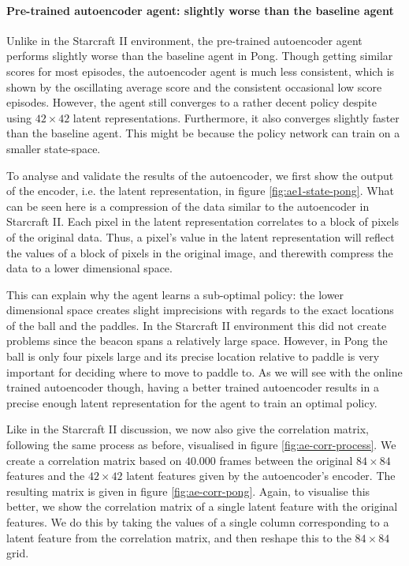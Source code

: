 \paragraph{Pre-trained autoencoder agent: slightly worse than the baseline agent}
Unlike in the Starcraft II environment, the pre-trained autoencoder agent performs slightly worse than the baseline agent in Pong. Though getting similar scores for most episodes, the autoencoder agent is much less consistent, which is shown by the oscillating average score and the consistent occasional low score episodes. However, the agent still converges to a rather decent policy despite using $42 \times 42$ latent representations. Furthermore, it also converges slightly faster than the baseline agent. This might be because the policy network can train on a smaller state-space.

To analyse and validate the results of the autoencoder, we first show the output of the encoder, i.e. the latent representation, in figure \ref{fig:ae1-state-pong}. What can be seen here is a compression of the data similar to the autoencoder in Starcraft II. Each pixel in the latent representation correlates to a block of pixels of the original data. Thus, a pixel's value in the latent representation will reflect the values of a block of pixels in the original image, and therewith compress the data to a lower dimensional space. 

This can explain why the agent learns a sub-optimal policy: the lower dimensional space creates slight imprecisions with regards to the exact locations of the ball and the paddles. In the Starcraft II environment this did not create problems since the beacon spans a relatively large space. However, in Pong the ball is only four pixels large and its precise location relative to paddle is very important for deciding where to move to paddle to. As we will see with the online trained autoencoder though, having a better trained autoencoder results in a precise enough latent representation for the agent to train an optimal policy.

Like in the Starcraft II discussion, we now also give the correlation matrix, following the same process as before, visualised in figure \ref{fig:ae-corr-process}. We create a correlation matrix based on $40.000$ frames between the original $84 \times 84$ features and the $42 \times 42$ latent features given by the autoencoder's encoder. The resulting matrix is given in figure \ref{fig:ae-corr-pong}. Again, to visualise this better, we show the correlation matrix of a single latent feature with the original features. We do this by taking the values of a single column corresponding to a latent feature from the correlation matrix, and then reshape this to the $84 \times 84$ grid.

